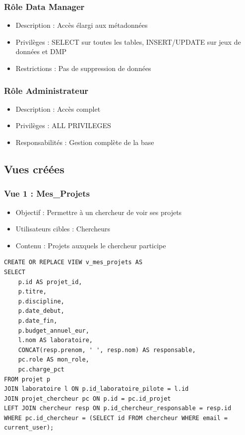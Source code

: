 \documentclass[12pt,a4paper]{article}
\begin{document}
\subsubsection{Rôle Data Manager}
\begin{itemize}
    \item Description : Accès élargi aux métadonnées
    \item Privilèges : SELECT sur toutes les tables, INSERT/UPDATE sur jeux de données et DMP
    \item Restrictions : Pas de suppression de données
\end{itemize}

\subsubsection{Rôle Administrateur}
\begin{itemize}
    \item Description : Accès complet
    \item Privilèges : ALL PRIVILEGES
    \item Responsabilités : Gestion complète de la base
\end{itemize}

\subsection{Vues créées}

\subsubsection{Vue 1 : Mes\_Projets}
\begin{itemize}
    \item Objectif : Permettre à un chercheur de voir ses projets
    \item Utilisateurs cibles : Chercheurs
    \item Contenu : Projets auxquels le chercheur participe
\end{itemize}

\begin{lstlisting}[style=sqlstyle, caption=Vue Mes\_Projets]
CREATE OR REPLACE VIEW v_mes_projets AS
SELECT 
    p.id AS projet_id,
    p.titre,
    p.discipline,
    p.date_debut,
    p.date_fin,
    p.budget_annuel_eur,
    l.nom AS laboratoire,
    CONCAT(resp.prenom, ' ', resp.nom) AS responsable,
    pc.role AS mon_role,
    pc.charge_pct
FROM projet p
JOIN laboratoire l ON p.id_laboratoire_pilote = l.id
JOIN projet_chercheur pc ON p.id = pc.id_projet
LEFT JOIN chercheur resp ON p.id_chercheur_responsable = resp.id
WHERE pc.id_chercheur = (SELECT id FROM chercheur WHERE email = current_user);
\end{lstlisting}
\end{document}
